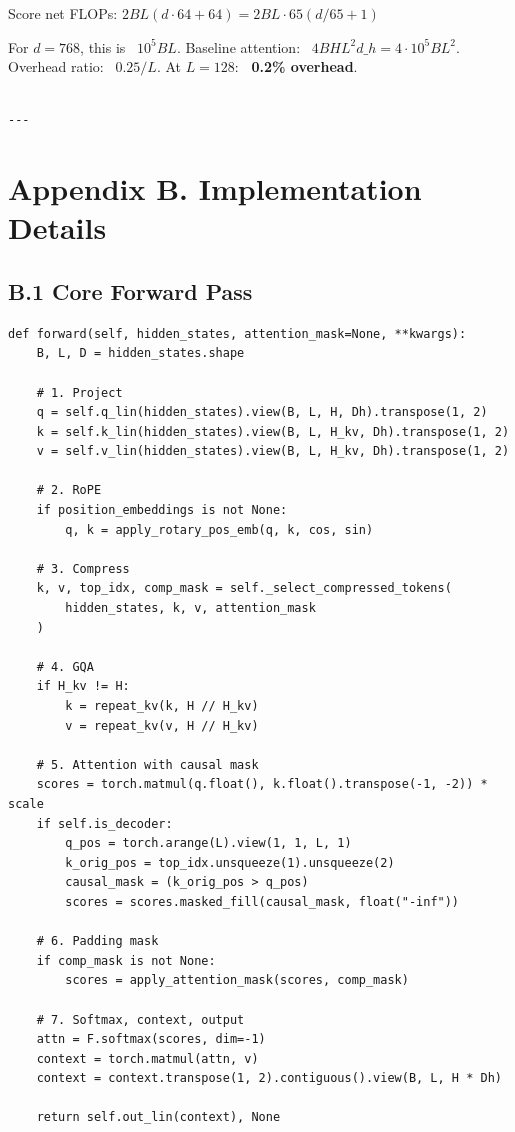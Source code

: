 Score net FLOPs: $2 B L (d \cdot 64 + 64) = 2 B L \cdot 65 (d/65 + 1)$

For $d = 768$, this is ~$10^5 B L$. Baseline attention: ~$4 B H L^2 d\_h = 
4 \cdot 10^5 B L^2$. Overhead ratio: ~$0.25 / L$. At $L = 128$: \textbf{~0.2\% overhead}.
\begin{lstlisting}

---
\end{lstlisting}

\section{Appendix B. Implementation Details}

\subsection{B.1 Core Forward Pass}

\begin{lstlisting}
def forward(self, hidden_states, attention_mask=None, **kwargs):
    B, L, D = hidden_states.shape
    
    # 1. Project
    q = self.q_lin(hidden_states).view(B, L, H, Dh).transpose(1, 2)
    k = self.k_lin(hidden_states).view(B, L, H_kv, Dh).transpose(1, 2)
    v = self.v_lin(hidden_states).view(B, L, H_kv, Dh).transpose(1, 2)
    
    # 2. RoPE
    if position_embeddings is not None:
        q, k = apply_rotary_pos_emb(q, k, cos, sin)
    
    # 3. Compress
    k, v, top_idx, comp_mask = self._select_compressed_tokens(
        hidden_states, k, v, attention_mask
    )
    
    # 4. GQA
    if H_kv != H:
        k = repeat_kv(k, H // H_kv)
        v = repeat_kv(v, H // H_kv)
    
    # 5. Attention with causal mask
    scores = torch.matmul(q.float(), k.float().transpose(-1, -2)) * scale
    if self.is_decoder:
        q_pos = torch.arange(L).view(1, 1, L, 1)
        k_orig_pos = top_idx.unsqueeze(1).unsqueeze(2)
        causal_mask = (k_orig_pos > q_pos)
        scores = scores.masked_fill(causal_mask, float("-inf"))
    
    # 6. Padding mask
    if comp_mask is not None:
        scores = apply_attention_mask(scores, comp_mask)
    
    # 7. Softmax, context, output
    attn = F.softmax(scores, dim=-1)
    context = torch.matmul(attn, v)
    context = context.transpose(1, 2).contiguous().view(B, L, H * Dh)
    
    return self.out_lin(context), None
\end{lstlisting}

